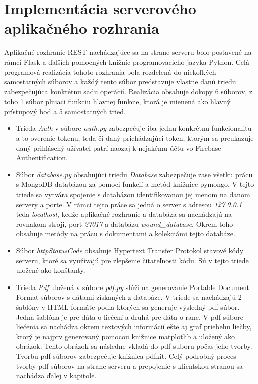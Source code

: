 \section{Implementácia serverového aplikačného rozhrania}
Aplikačné rozhranie REST nachádzajúce sa na strane serveru bolo postavené na rámci Flask a ďalších pomocných knižníc programovacieho jazyka Python. Celá programová realizácia tohoto rozhrania bola rozdelená do niekoľkých samostatných súborov a každý tento súbor predstavuje vlastne danú triedu zabezpečujúca konkrétnu sadu operácií. Realizácia obsahuje dokopy 6 súborov, z toho 1 súbor plniaci funkciu hlavnej funkcie, ktorá je mienená ako hlavný prístupový bod a 5 samostatných tried.
\begin{itemize}
\item Trieda \textit{Auth} v súbore \textit{auth.py} zabezpečuje iba jednu konkrétnu funkcionalitu a to overenie tokenu, teda či daný prichádzajúci token, ktorým sa preukazuje daný prihlásený užívateľ patrí naozaj k nejakému účtu vo Firebase Authentification.

\item Súbor \textit{database.py} obsahujúci triedu \textit{Database} zabezpečuje zase všetku prácu s MongoDB databázou za pomoci funkcií a metód knižnice pymongo. V tejto triede sa vytvára spojenie s databázou identifikovanou jej menom na danom servery a porte. V rámci tejto práce sa jedná o server s adresou \textit{127.0.0.1} teda \textit{localhost}, keďže aplikačné rozhranie a databáza sa nachádzajú na rovnakom stroji, port \textit{27017} a databázu \textit{wound\_database}. Okrem toho obsahuje metódy na prácu s dokumentami a kolekciámi tejto databáze.

\item Súbor \textit{httpStatusCode} obsahuje Hypertext Transfer Protokol stavové kódy serveru, ktoré sa využívajú pre zlepšenie čitateľnosti kódu. Sú v tejto triede uložené ako konštanty.

\item Trieda \textit{Pdf} uložená v súbore \textit{pdf.py} slúži na generovanie Portable Document Format súborov s dátami získaných z databáze. V triede sa nachádzajú 2 šablóny v HTML  formáte podľa ktorých sa generuje výsledný pdf súbor. Jedna šablóna je pre dáta o liečení a druhá pre dáta o rane. V pdf súbore liečenia sa nachádza okrem textových informácií ešte aj graf priebehu liečby, ktorý je najprv generovaný pomocou knižnice matplotlib a uložený ako obrázok. Tento obrázok sa následne vkladá do pdf suboru počas jeho tvorby. Tvorbu pdf súborov zabezpečuje knižnica pdfkit. Celý podrobný proces tvorby pdf súborov na strane serveru a prepojenie s klientskou stranou sa nachádza ďalej v kapitole.


\end{itemize}
